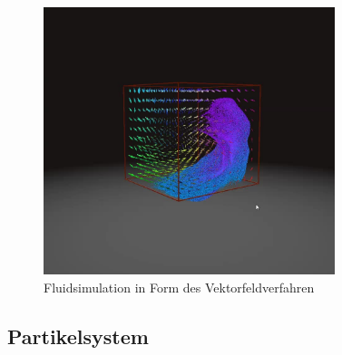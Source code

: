 \documentclass[intern,palatino]{cgBA}
\begin{document}
\begin{figure}[h]
	\centering
	\includegraphics[width=8.5cm]{Bilder/vektorfeld.jpg}
	\caption[Fluidsimulation in Form des Vektorfeldverfahren \newline Quelle:\url{https://thumbs.gfycat.com/CelebratedElasticHartebeest-poster.jpg}]{Fluidsimulation in Form des Vektorfeldverfahren}
	\label{img:Vertexfeld}
\end{figure}


\subsection{Partikelsystem}
\end{document}
